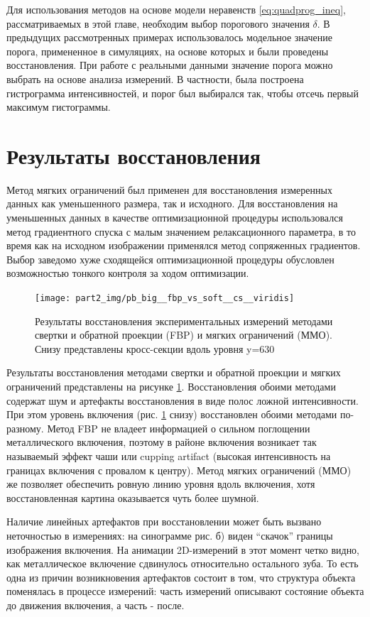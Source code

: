 Для использования методов на основе модели неравенств \ref{eq:quadprog_ineq}, рассматриваемых в этой главе, необходим выбор порогового значения $\delta$.
В предыдущих рассмотренных примерах использовалось модельное значение порога, примененное в симуляциях, на основе которых и были проведены восстановления.
При работе с реальными данными значение порога можно выбрать на основе анализа измерений.
В частности, была построена гистрограмма интенсивностей, и порог был выбирался так, чтобы отсечь первый максимум гистограммы.


\section{Результаты восстановления}
Метод мягких ограничений был применен для восстановления измеренных данных как уменьшенного размера, так и исходного.
Для восстановления на уменьшенных данных в качестве оптимизационной процедуры использовался метод градиентного спуска с малым значением релаксационного параметра, в то время как на исходном изображении применялся метод сопряженных градиентов. 
Выбор заведомо хуже сходящейся оптимизационной процедуры обусловлен возможностью тонкого контроля за ходом оптимизации.

\begin{figure}
    \centering
    \texttt{[image: part2\_img/pb\_big\_\_fbp\_vs\_soft\_\_cs\_\_viridis]} \\
    \caption{Результаты восстановления экспериментальных измерений методами свертки и обратной проекции (FBP) и мягких ограничений (ММО). Снизу представлены кросс-секции вдоль уровня y=630}
    \label{fig:fbp_vs_soft__zub}
\end{figure}

Результаты восстановления методами свертки и обратной проекции и мягких ограничений представлены на рисунке \ref{fig:fbp_vs_soft__zub}.
Восстановления обоими методами содержат шум и артефакты восстановления в виде полос ложной интенсивности.
При этом уровень включения (рис. \ref{fig:fbp_vs_soft__zub} снизу) восстановлен обоими методами по-разному.
Метод FBP не владеет информацией о сильном поглощении металлического включения, поэтому в районе включения возникает так называемый эффект чаши или cupping artifact (высокая интенсивность на границах включения с провалом к центру).
Метод мягких ограничений (ММО) же позволяет обеспечить ровную линию уровня вдоль включения, хотя восстановленная картина оказывается чуть более шумной.

Наличие линейных артефактов при восстановлении может быть вызвано неточностью в измерениях: на синограмме рис. \label{fig:sino_zub} б) виден ``скачок'' границы изображения включения.
На анимации 2D-измерений в этот момент четко видно, как металлическое включение сдвинулось относительно остального зуба.
То есть одна из причин возникновения артефактов состоит в том, что структура объекта поменялась в процессе измерений: часть измерений описывают состояние объекта до движения включения, а часть - после.

